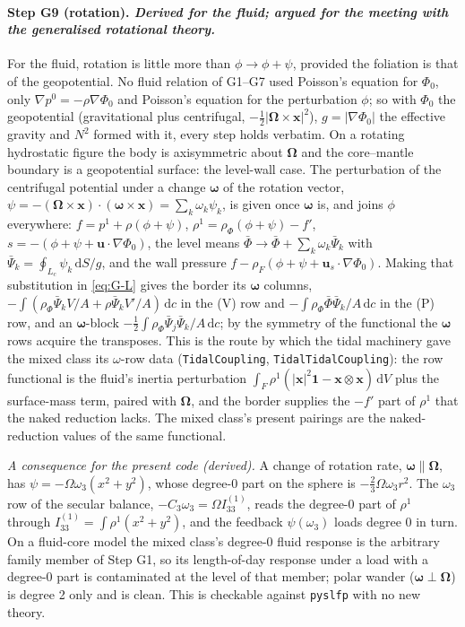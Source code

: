 \documentclass[11pt]{article}
\newcommand{\bu}{\mathbf{u}}
\newcommand{\dV}{\,\mathrm{d}V}
\newcommand{\code}[1]{\texttt{#1}}
\begin{document}
\paragraph{Step G9 (rotation). \emph{Derived for the fluid; argued for
the meeting with the generalised rotational theory.}} For the fluid,
rotation is little more than $\phi \to \phi + \psi$, provided the
foliation is that of the geopotential. No fluid relation of G1--G7 used
Poisson's equation for $\Phi_0$, only $\nabla p^0 = -\rho\nabla\Phi_0$
and Poisson's equation for the perturbation $\phi$; so with $\Phi_0$ the
geopotential (gravitational plus centrifugal, $-\tfrac12|\boldsymbol\Omega\times\mathbf x|^2$),
$g = |\nabla\Phi_0|$ the effective gravity and $N^2$ formed with it,
every step holds verbatim. On a rotating hydrostatic figure the body is
axisymmetric about $\boldsymbol\Omega$ and the core--mantle boundary is
a geopotential surface: the level-wall case. The perturbation of the
centrifugal potential under a change $\boldsymbol\omega$ of the rotation
vector, $\psi = -(\boldsymbol\Omega\times\mathbf x)\cdot(\boldsymbol\omega\times\mathbf x)
= \sum_k\omega_k\psi_k$, is given once $\boldsymbol\omega$ is, and joins
$\phi$ everywhere: $f = p^1 + \rho(\phi+\psi)$, $\rho^1 = \rho_\Phi(\phi+\psi)
- f'$, $s = -(\phi + \psi + \bu\cdot\nabla\Phi_0)$, the level means
$\bar\Phi \to \bar\Phi + \sum_k\omega_k\bar\Psi_k$ with $\bar\Psi_k =
\oint_{L_c}\psi_k\,\mathrm dS/g$, and the wall pressure
$f - \rho_F(\phi + \psi + \bu_s\cdot\nabla\Phi_0)$. Making that
substitution in \eqref{eq:G-L} gives the border its $\boldsymbol\omega$
columns, $-\int(\rho_\Phi\bar\Psi_kV/A + \rho\bar\Psi_kV'/A)\,\mathrm dc$
in the (V) row and $-\int\rho_\Phi\bar\Phi\bar\Psi_k/A\,\mathrm dc$ in the
(P) row, and an $\boldsymbol\omega$-block
$-\tfrac12\int\rho_\Phi\bar\Psi_j\bar\Psi_k/A\,\mathrm dc$; by the
symmetry of the functional the $\boldsymbol\omega$ rows acquire the
transposes. This is the route by which the tidal machinery gave the
mixed class its $\omega$-row data (\code{TidalCoupling},
\code{TidalTidalCoupling}): the row functional is the fluid's inertia
perturbation $\int_F\rho^1(|\mathbf x|^2\mathbf 1 - \mathbf x\otimes\mathbf x)\dV$
plus the surface-mass term, paired with $\boldsymbol\Omega$, and the
border supplies the $-f'$ part of $\rho^1$ that the naked reduction
lacks. The mixed class's present pairings are the naked-reduction
values of the same functional.

\emph{A consequence for the present code (derived).} A change of
rotation rate, $\boldsymbol\omega \parallel \boldsymbol\Omega$, has
$\psi = -\Omega\omega_3(x^2 + y^2)$, whose degree-0 part on the sphere is
$-\tfrac23\Omega\omega_3 r^2$. The $\omega_3$ row of the secular
balance, $-C_3\omega_3 = \Omega I^{(1)}_{33}$, reads the degree-0 part of
$\rho^1$ through $I^{(1)}_{33} = \int\rho^1(x^2 + y^2)$, and the
feedback $\psi(\omega_3)$ loads degree 0 in turn. On a fluid-core model
the mixed class's degree-0 fluid response is the arbitrary family member
of Step G1, so its length-of-day response under a load with a degree-0
part is contaminated at the level of that member; polar wander
($\boldsymbol\omega \perp \boldsymbol\Omega$) is degree 2 only and is
clean. This is checkable against \code{pyslfp} with no new theory.
\end{document}
